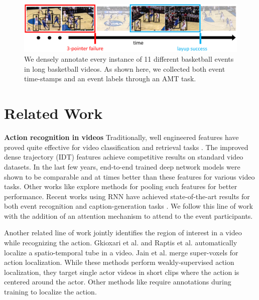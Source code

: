 \begin{figure}[ht!]
  \includegraphics[width=6.5 in]{images/dataset_figure_cropped.pdf}
  \caption{We densely annotate every instance of 11 different basketball events in long basketball
  videos. As shown here, we collected both event time-stamps and an event labels through an
AMT task.}
\end{figure}



\section{Related Work}

\noindent \textbf{Action recognition in videos}
Traditionally, well engineered features have proved quite effective for video
classification and retrieval tasks
\cite{Dalal_ECCV06,Jain_CVPR13,Jiang_ECCV12,Laptev_CVPR08,
Niebels_ECCV10,Oh_MVA14,Laxton_CVPR07,Oneata_ICCV13,Peng_ECCV14,Sadanand_CVPR12,Schuldt_ICPR04,Wang_BMVC09,Wang_CVPR11}.
The improved dense trajectory (IDT) features \cite{Wang_CVPR11} achieve
competitive results on standard video datasets.  In the last few years,
end-to-end trained deep network models
\cite{Ji_PAMI13,Karpathy_CVPR14,Simonyan_2014,Simonyan_NIPS14,Tran_arxiv14} were shown to be comparable and
at times better than these features for various video tasks.  Other works like
\cite{Wang_arxiv15,Xu_2015,Zha_2015} explore methods for pooling such
features for better performance. Recent works using RNN have achieved
state-of-the-art results for both event recognition and caption-generation
tasks \cite{Donahue_arxiv14,Ng_arxiv15,Srivastava_2015,Yao_arxiv15}.
We follow this line of work with the addition of an attention mechanism
to attend to the event participants.

Another related line of work jointly identifies the region of interest in a video
while recognizing the action.
Gkioxari et al.  \cite{Gkioxari_arxiv14} and Raptis et al. \cite{Raptis_CVPR12}
automatically localize a spatio-temporal tube in a video.
Jain et al. \cite{Jain_CVPR14} merge super-voxels for action localization.
While these methods perform weakly-supervised action localization, they target
single actor videos in short clips where the action is centered around the actor.
Other methods like \cite{Lan_ICCV11,Prest_PAMI13,Tian_CVPR13,Wang_ECCV14} require annotations
during training to localize the action.

